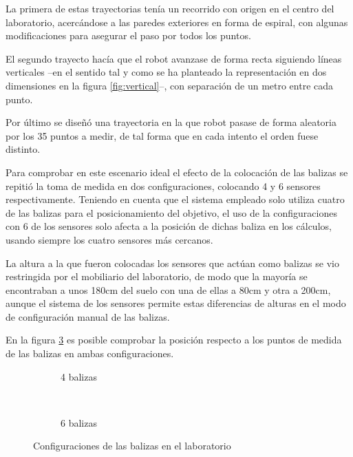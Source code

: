 La primera de estas trayectorias tenía un recorrido con origen en el centro del laboratorio, acercándose a las paredes exteriores en forma de espiral, con algunas modificaciones para asegurar el paso por todos los puntos.

El segundo trayecto hacía que el robot avanzase de forma recta siguiendo líneas verticales --en el sentido tal y como se ha planteado la representación en dos dimensiones en la figura \ref{fig:vertical}--, con separación de un metro entre cada punto.

Por último se diseñó una trayectoria en la que robot pasase de forma aleatoria por los 35 puntos a medir, de tal forma que en cada intento el orden fuese distinto.

Para comprobar en este escenario ideal el efecto de la colocación de las balizas se repitió la toma de medida en dos configuraciones, colocando 4 y 6 sensores respectivamente.
Teniendo en cuenta que el sistema empleado solo utiliza cuatro de las balizas para el posicionamiento del objetivo, el uso de la configuraciones con 6 de los sensores solo afecta a la posición de dichas baliza en los cálculos, usando siempre los cuatro sensores más cercanos.

La altura a la que fueron colocadas los sensores que actúan como balizas se vio restringida por el mobiliario del laboratorio, de modo que la mayoría se encontraban a unos 180cm del suelo con una de ellas a 80cm y otra a 200cm, aunque el sistema de los sensores permite estas diferencias de alturas en el modo de configuración manual de las balizas.

En la figura \ref{fig:lab_sensores} es posible comprobar la posición respecto a los puntos de medida de las balizas en ambas configuraciones.

\begin{figure}[H]
  \begin{subfigure}[b]{.5\textwidth}
    \centering
    \def\svgwidth{0.7\linewidth}
     
    \caption{4 balizas}
    \label{fig:lab_4sens}
  \end{subfigure}
  \ \
  \begin{subfigure}[b]{.5\textwidth}
    \centering
    \def\svgwidth{0.82\linewidth}
      
    \caption{6 balizas}
    \label{fig:lab_6sens}
  \end{subfigure}
  \caption{Configuraciones de las balizas en el laboratorio}
  \label{fig:lab_sensores}
\end{figure}

